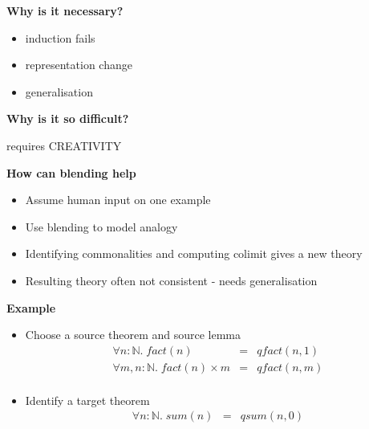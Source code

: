 \documentclass{beamer}
\begin{document}
\newpage

\begin{frame}
\begin{center}{\bf Why is it necessary?}\end{center}
\begin{itemize}
\item induction fails
\item representation change
\item generalisation
\end{itemize}
\end{frame}

\newpage

\begin{frame}
\begin{center}{\bf Why is it so difficult?}\end{center}
requires CREATIVITY
\end{frame}

\newpage

\begin{frame}
\begin{center}{\bf How can blending help}\end{center}
\begin{itemize}
\item{Assume human input on one example}
\item{Use blending to model analogy}
\item{Identifying commonalities and computing colimit gives a new theory}
\item{Resulting theory often not consistent - needs generalisation}
\end{itemize}
\end{frame}

\newpage

\begin{frame}
\begin{center}{\bf Example}\end{center}
\begin{itemize}
\item{Choose a source theorem and source lemma}
\begin{eqnarray*}
\forall n:\mathbb{N}.\;fact(n)&=&qfact(n,1)\\
\forall m,n:\mathbb{N}.\;fact(n) \times m&=&qfact(n,m)\\
\end{eqnarray*}
\item{Identify a target theorem}
\begin{eqnarray*}
\forall n:\mathbb{N}.\;sum(n)&=&qsum(n,0)
\end{eqnarray*}
\end{itemize}
\end{frame}
\end{document}
